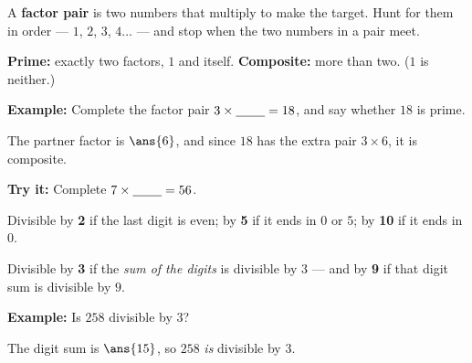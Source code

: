\documentclass[12pt]{article}
\begin{document}


\begin{formulabox}
A \textbf{factor pair} is two numbers that multiply to make the target. Hunt
for them in order --- $1$, $2$, $3$, $4 \ldots$ --- and stop when the two
numbers in a pair meet.\par
\textbf{Prime:} exactly two factors, $1$ and itself. \textbf{Composite:} more
than two. ($1$ is neither.)
\end{formulabox}

\begin{examplebox}
\textbf{Example:} \quad Complete the factor pair $3 \times
\underline{\hspace{0.8cm}} = 18$, and say whether $18$ is prime.

The partner factor is $\ans{6}$, and since $18$ has the extra pair
$3 \times 6$, it is composite.
\end{examplebox}

\begin{tryitbox}
\textbf{Try it:} \quad Complete $7 \times \underline{\hspace{0.8cm}} = 56$.\\[2pt]
\end{tryitbox}


\begin{formulabox}
Divisible by \textbf{2} if the last digit is even; by \textbf{5} if it ends in
$0$ or $5$; by \textbf{10} if it ends in $0$.\par
Divisible by \textbf{3} if the \emph{sum of the digits} is divisible by $3$ ---
and by \textbf{9} if that digit sum is divisible by $9$.
\end{formulabox}

\begin{examplebox}
\textbf{Example:} \quad Is $258$ divisible by $3$?

The digit sum is $\ans{15}$, so $258$ \emph{is} divisible by $3$.
\end{examplebox}
\end{document}
